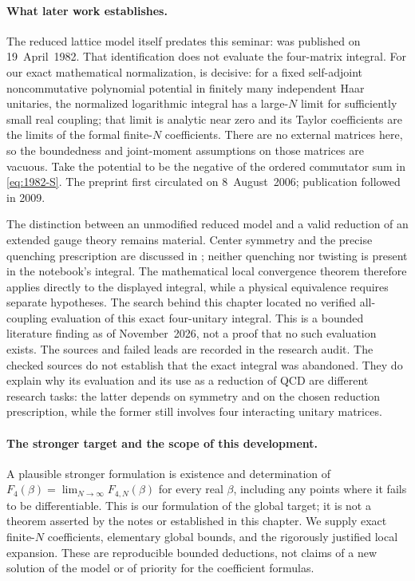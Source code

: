 \paragraph{What later work establishes.}
The reduced lattice model itself predates this seminar:
\citet{eguchikawai1982reduction} was published on 19~April~1982.
That identification does not evaluate the four-matrix integral.
For our exact mathematical normalization,
\citet[Theorem~0.1]{collinsguionnetmaurel2009asymptotics}
is decisive: for a fixed self-adjoint noncommutative polynomial potential in
finitely many independent Haar unitaries, the normalized logarithmic integral
has a large-\(N\) limit for sufficiently small real coupling; that limit is
analytic near zero and its Taylor coefficients are the limits of the formal
finite-\(N\) coefficients. There are no external matrices here, so the
boundedness and joint-moment assumptions on those matrices are vacuous.
Take the potential to be the negative of the ordered commutator sum in
\eqref{eq:1982-S}. The preprint first circulated on 8~August~2006; publication
followed in 2009.

The distinction between an unmodified reduced model and a valid reduction
of an extended gauge theory remains material. Center symmetry and the precise
quenching prescription are discussed in
\citet[Secs.~II--III]{neuberger2020quenched}; neither quenching nor twisting
is present in the notebook's integral. The mathematical local convergence
theorem therefore applies directly to the displayed integral, while a
physical equivalence requires separate hypotheses. The search behind this
chapter located no verified all-coupling evaluation of this exact four-unitary
integral. This is a bounded literature finding as of November~2026, not a
proof that no such evaluation exists. The sources and failed leads are
recorded in the research audit.
The checked sources do not establish that the exact integral was abandoned.
They do explain why its evaluation and its use as a reduction of QCD are
different research tasks: the latter depends on symmetry and on the chosen
reduction prescription, while the former still involves four interacting
unitary matrices.

\paragraph{The stronger target and the scope of this development.}
A plausible stronger formulation is existence and determination of
\(F_4(\beta)=\lim_{N\to\infty}F_{4,N}(\beta)\) for every real \(\beta\),
including any points where it fails to be differentiable. This is our
formulation of the global target; it is not a theorem asserted by the notes
or established in this chapter. We supply exact finite-\(N\) coefficients,
elementary global bounds, and the rigorously justified local expansion.
These are reproducible bounded deductions, not claims of a new solution
of the model or of priority for the coefficient formulas.


